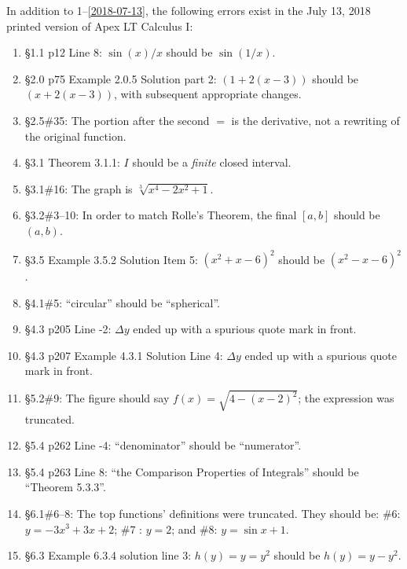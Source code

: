 \documentclass{amsart}
\makeatletter
\newcommand{\reforzero}[1]{%
 \@ifundefined{r@#1}{0}{\ref{#1}}%
}
\makeatother
\begin{document}
In addition to 1--\ref{2018-07-13}, the following errors exist in the July 13, 2018 printed version of Apex LT Calculus I:\\[-2\baselineskip]
\begin{enumerate}\setcounter{enumi}{\reforzero{2018-07-13}}
\item \S1.1 p12 Line 8: $\sin(x)/x$ should be $\sin(1/x)$.
\item \S2.0 p75 Example 2.0.5 Solution part 2: $(1+2(x-3))$ should be $(x+2(x-3))$, with subsequent appropriate changes.
\item \S2.5\#35: The portion after the second $=$ is the derivative, not a rewriting of the original function.
\item \S3.1 Theorem 3.1.1: $I$ should be a \emph{finite} closed interval.
\item \S3.1\#16: The graph is $\sqrt[3]{x^4-2x^2+1}$.
\item \S3.2\#3--10: In order to match Rolle's Theorem, the final $[a,b]$ should be $(a,b)$.
\item \S3.5 Example 3.5.2 Solution Item 5: $(x^2+x-6)^2$ should be $(x^2-x-6)^2$.
\item \S4.1\#5: ``circular'' should be ``spherical''.
\item \S4.3 p205 Line -2: $\Delta y$ ended up with a spurious quote mark in front.
\item \S4.3 p207 Example 4.3.1 Solution Line 4: $\Delta y$ ended up with a spurious quote mark in front.
\item \S5.2\#9: The figure should say $f(x)=\sqrt{4-(x-2)^2}$; the expression was truncated.
\item \S5.4 p262 Line -4: ``denominator'' should be ``numerator''.
\item \S5.4 p263 Line 8: ``the Comparison Properties of Integrals'' should be ``Theorem 5.3.3''.
\item \S6.1\#6--8: The top functions' definitions were truncated.  They should be: \#6: $y=-3x^3+3x+2$; \#7 : $y=2$; and \#8: $y=\sin x+1$.
\item \S6.3 Example 6.3.4 solution line 3: $h(y)=y=y^2$ should be $h(y)=y-y^2$.

\end{enumerate}
\end{document}
